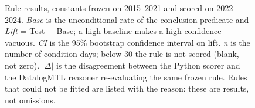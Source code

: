 \begin{figure}
\begin{tabular}{lllrrrrrrrl}
\bottomrule
\end{tabular}
\caption{\small{Rule results, constants frozen on 2015--2021 and scored on 2022--2024. \emph{Base} is the unconditional rate of the conclusion predicate and \emph{Lift} = Test $-$ Base; a high baseline makes a high confidence vacuous. \emph{CI} is the 95\% bootstrap confidence interval on lift. \emph{n} is the number of condition days; below 30 the rule is not scored (blank, not zero). $|\Delta|$ is the disagreement between the Python scorer and the DatalogMTL reasoner re-evaluating the same frozen rule. Rules that could not be fitted are listed with the reason: these are results, not omissions.}}
\label{fig:rule-results}
\end{figure}
